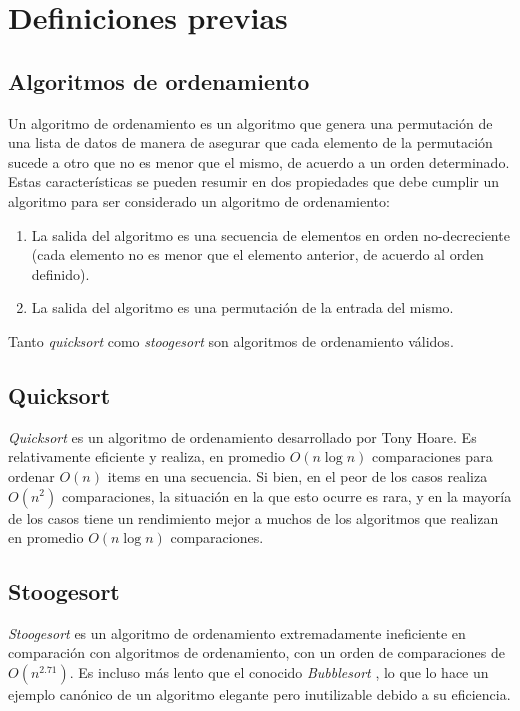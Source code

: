 \documentclass[a4paper,11pt]{article}
\begin{document}
\section{Definiciones previas}

\subsection{Algoritmos de ordenamiento}

Un algoritmo de ordenamiento es un algoritmo que genera una permutación de una
lista de datos de manera de asegurar que cada elemento de la permutación sucede
a otro que no es menor que el mismo, de acuerdo a un orden determinado. Estas
características se pueden resumir en dos propiedades que debe cumplir un
algoritmo para ser considerado un algoritmo de ordenamiento:

\begin{enumerate}

  \item La salida del algoritmo es una secuencia de elementos en orden
    no-decreciente (cada elemento no es menor que el elemento anterior, de
    acuerdo al orden definido).

  \item La salida del algoritmo es una permutación de la entrada del mismo.

\end{enumerate}

Tanto \textit{quicksort} como \textit{stoogesort} son algoritmos de
ordenamiento válidos.

\subsection{Quicksort}

\textit{Quicksort} es un algoritmo de ordenamiento desarrollado por Tony Hoare.
Es relativamente eficiente y realiza, en promedio \(O(n\log{n})\) comparaciones
para ordenar \(O(n)\) items en una secuencia. Si bien, en el peor de los casos
realiza \(O(n^2)\) comparaciones, la situación en la que esto ocurre es rara, y
en la mayoría de los casos tiene un rendimiento mejor a muchos de los
algoritmos que realizan en promedio \(O(n\log{n})\) comparaciones.

\subsection{Stoogesort}\label{sec:introstooge}

\textit{Stoogesort} es un algoritmo de ordenamiento extremadamente ineficiente
en comparación con algoritmos de ordenamiento, con un orden de comparaciones de
\(O(n^{2.71})\). Es incluso más lento que el conocido \textit{Bubblesort}
\cite{WIKIBUB}, lo que lo hace un ejemplo canónico de un algoritmo elegante
pero inutilizable debido a su eficiencia.
\end{document}
